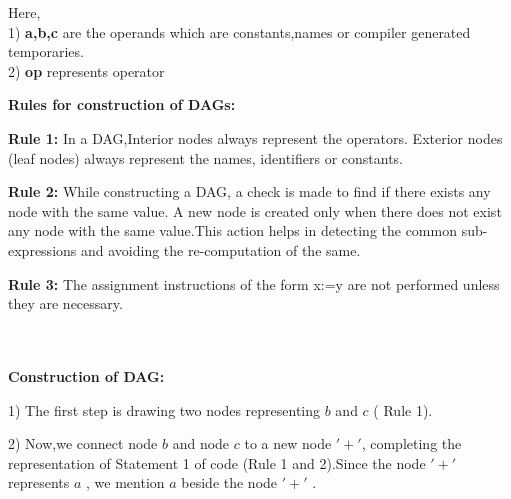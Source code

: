 \documentclass[journal,12pt,twocolumn]{IEEEtran}
\begin{document}
Here,
\\ 1) \textbf{a,b,c} are the operands which are constants,names or compiler generated temporaries.
\\ 2)  \textbf{op} represents operator

\textbf{Rules for construction of DAGs:} 

\textbf{Rule 1:} 
  In a DAG,Interior nodes always represent the operators.
    Exterior nodes (leaf nodes) always represent the names, identifiers or constants.

\textbf{Rule 2:}  While constructing a DAG, a check is made to find if there exists any node with the same value. A new node is created only when there does not exist any node with the same value.This action helps in detecting the common sub-expressions and avoiding the re-computation of the same.

\textbf{Rule 3:}  The assignment instructions of the form x:=y are not performed unless they are necessary.


\\~\\

\textbf{Construction of DAG:} 

1) The first step is drawing two nodes representing $b$ and $c$ ( Rule 1).
\begin{center}

\end{center}

2) Now,we connect node $b$ and node $c$ to a new node $'+'$, completing the representation of Statement 1 of code (Rule 1 and 2).Since the node $'+'$ represents $a$ , we mention $a$ beside the node $'+'$ . 


\begin{center}

\end{center}
\end{document}
